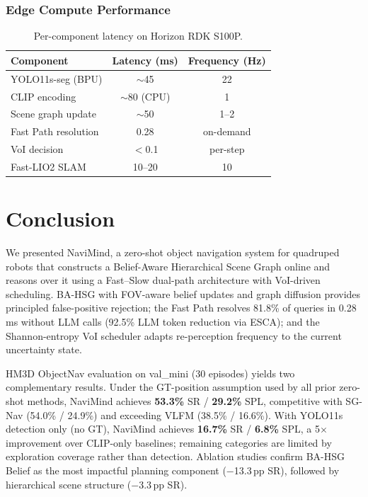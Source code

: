 \documentclass[conference]{IEEEtran}
\begin{document}
\subsubsection{Edge Compute Performance}

\begin{table}[t]
\centering
\caption{Per-component latency on Horizon RDK S100P.}
\label{tab:latency}
\footnotesize
\begin{tabular}{@{}lcc@{}}
\toprule
Component & Latency (ms) & Frequency (Hz) \\
\midrule
YOLO11s-seg (BPU)    & $\sim$45 & 22 \\
CLIP encoding        & $\sim$80 (CPU) & 1 \\
Scene graph update   & $\sim$50 & 1--2 \\
Fast Path resolution & 0.28     & on-demand \\
VoI decision         & $<$0.1   & per-step \\
Fast-LIO2 SLAM       & 10--20   & 10 \\
\bottomrule
\end{tabular}
\vspace{-2mm}
\end{table}

\section{Conclusion}
\label{sec:conclusion}

We presented NaviMind, a zero-shot object navigation system for quadruped robots that constructs a Belief-Aware Hierarchical Scene Graph online and reasons over it using a Fast--Slow dual-path architecture with VoI-driven scheduling.
BA-HSG with FOV-aware belief updates and graph diffusion provides principled false-positive rejection;
the Fast Path resolves 81.8\% of queries in 0.28\,ms without LLM calls (92.5\% LLM token reduction via ESCA);
and the Shannon-entropy VoI scheduler adapts re-perception frequency to the current uncertainty state.

HM3D ObjectNav evaluation on val\_mini (30 episodes) yields two complementary results.
Under the GT-position assumption used by all prior zero-shot methods, NaviMind achieves \textbf{53.3\%} SR / \textbf{29.2\%} SPL, competitive with SG-Nav (54.0\% / 24.9\%) and exceeding VLFM (38.5\% / 16.6\%).
With YOLO11s detection only (no GT), NaviMind achieves \textbf{16.7\%} SR / \textbf{6.8\%} SPL, a 5$\times$ improvement over CLIP-only baselines; remaining categories are limited by exploration coverage rather than detection.
Ablation studies confirm BA-HSG Belief as the most impactful planning component ($-$13.3\,pp SR), followed by hierarchical scene structure ($-$3.3\,pp SR).
\end{document}
